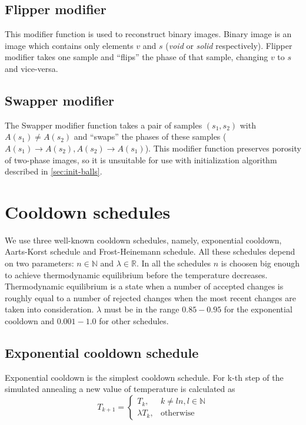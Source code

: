 \documentclass[preprint,amsmath,amssymb,aps,pre,nofootinbib]{revtex4-1}
\begin{document}
\subsection{Flipper modifier}
\label{sec:flipper}
This modifier function is used to reconstruct binary images. Binary image is
an image which contains only elements $v$ and $s$ (\textit{void} or
\textit{solid} respectively). Flipper modifier takes one sample and ``flips''
the phase of that sample, changing $v$ to $s$ and vice-versa.

\subsection{Swapper modifier}
\label{sec:swapper}
The Swapper modifier function takes a pair of samples $(s_1, s_2)$ with
$A(s_1) \ne A(s_2)$ and ``swaps'' the phases of these samples
($A(s_1) \rightarrow A(s_2), A(s_2) \rightarrow A(s_1)$). This modifier function
preserves porosity of two-phase images, so it is unsuitable for use with
initialization algorithm described in \cref{sec:init-balls}.

\section{Cooldown schedules}
\label{sec:cooldown}
We use three well-known cooldown schedules, namely, exponential cooldown,
Aarts-Korst schedule \cite{Aarts-Korst} and Frost-Heinemann
\cite{Frost-Heinemann} schedule. All these schedules depend on two parameters:
$n \in \mathbb{N}$ and $\lambda \in \mathbb{R}$. In all the schedules $n$ is
choosen big enough to achieve thermodynamic equilibrium before the temperature
decreases. Thermodynamic equilibrium is a state when a number of accepted
changes is roughly equal to a number of rejected changes when the most recent
changes are taken into consideration. $\lambda$ must be in the range $0.85-0.95$
for the exponential cooldown and $0.001-1.0$ for other schedules.

\subsection{Exponential cooldown schedule}
\label{sec:cooldown-exp}
Exponential cooldown is the simplest cooldown schedule. For k-th step of the
simulated annealing a new value of temperature is calculated as
\begin{equation*}
  T_{k+1} =
  \begin{cases}
    T_k, & k \ne ln, l \in \mathbb{N} \\
    \lambda T_k, & \text{otherwise}
  \end{cases}
\end{equation*}
\end{document}
